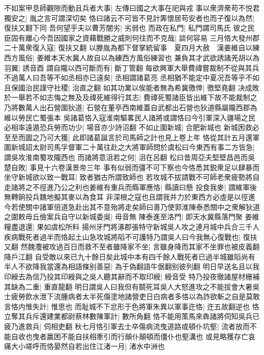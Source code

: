 不如案甲息師觀隙而動且兵者大事|{
	左傳曰國之大事在祀與戎}
事以衆濟衆苟不悦君獨安之|{
	胤之言可謂深切矣}
恪曰諸云不可皆不見計筭懷居苟安者也而子復以為然|{
	復扶又翻下同}
吾何望乎夫以曹芳闇劣|{
	劣弱也}
而政在私門|{
	私門謂司馬氏}
彼之民臣固有離心今吾因國家之資藉戰勝之威則何往而不克哉|{
	談何容易}
三月恪大發州郡二十萬衆復入寇|{
	復扶又翻}
以滕胤為都下督掌統留事　夏四月大赦　漢姜維自以練西方風俗|{
	姜維本天水冀人故自以為練西方風俗練習也}
兼負其才武欲誘諸羌胡以為羽翼|{
	誘音酉}
謂自隴以西可斷而有|{
	斷丁管翻}
每欲興軍大舉費禕嘗裁制不從與其兵不過萬人曰吾等不如丞相亦已遠矣|{
	丞相謂諸葛亮}
丞相猶不能定中夏况吾等乎不如且保國治民謹守社稷|{
	治直之翻}
如其功業以俟能者無為希冀徼倖|{
	徼堅堯翻}
决成敗於一舉若不如志悔之無及及禕死維得行其志|{
	費禕死蜀諸臣皆出維下故不能裁制之}
乃將數萬人出石營圍狄道|{
	石營在董亭西南維蓋自武都出石營也狄道縣屬隴西郡為維以勞民亡蜀張本}
吳諸葛恪入寇淮南驅畧民人諸將或謂恪曰今引軍深入疆場之民必相率遠遁恐兵勞而功少|{
	場音亦少詩沼翻}
不如止圍新城|{
	合肥新城也}
新城困救必至至而圖之乃可大獲|{
	此即諸葛誕言於司馬師之計也見上卷上年}
恪從其計五月還軍圍新城詔太尉司馬孚督軍二十萬往赴之大將軍師問於虞松曰今東西有事二方皆急|{
	謂吳攻淮南蜀攻隴西也}
而諸將意沮若之何|{
	沮在呂翻}
松曰昔周亞夫堅壁昌邑而吳楚自敗|{
	事見十六卷漢景帝三年}
事有似弱而彊不可下察也今恪悉其鋭衆足以肆暴而坐守新城欲以致一戰耳|{
	致者猶古所謂致師也}
若攻城不拔請戰不可師老衆疲勢將自走諸將之不徑進乃公之利也姜維有重兵而縣軍應恪|{
	縣讀曰懸}
投食我麥|{
	謂維軍後無轉餉投兵魏地擬其麥以為食耳}
非深根之寇也且謂我并力於東西方必虛是以徑進今若使關中諸軍倍道急赴出其不意殆將走矣師曰善乃使郭淮陳泰悉關中之衆解狄道之圍敕毋丘儉案兵自守以新城委吳|{
	毋音無}
陳泰進至洛門|{
	即天水冀縣落門聚}
姜維糧盡退還|{
	果如虞松所料}
揚州牙門將涿郡張特守新城吳人攻之連月城中兵合三千人疾病戰死者過半而恪起土山急攻城將䧟不可護特乃謂吳人曰今我無心復戰也|{
	復扶又翻}
然魏灋被攻過百日而救不至者雖降家不坐|{
	言雖身降而其家不坐罪也被皮義翻降戶江翻}
自受敵以來已九十餘日矣此城中本有四千餘人戰死者已過半城雖䧟尚有半人不欲降我當還為相語條别善惡|{
	為于偽翻語牛倨翻别彼列翻}
明日早送名且以我印綬去為信乃投其印綬與之吳人聽其辭而不取印綬|{
	綬音受}
特乃投夜徹諸屋材栅補其缺為二重|{
	重直龍翻}
明日謂吳人曰我但有鬬死耳吳人大怒進攻之不能拔會大暑吳士疲勞飲水泄下流腫病者太半死傷塗地諸營吏日白病者多恪以為詐欲斬之自是莫敢言恪内惟失計|{
	惟思也}
而耻城不下忿形于色將軍朱異以軍事迕恪|{
	迕五故翻逆也}
恪立奪其兵斥還建業都尉蔡林數陳軍計|{
	數所角翻}
恪不能用策馬來犇諸將伺知吳兵已疲乃進救兵|{
	伺相吏翻}
秋七月恪引軍去士卒傷病流曳道路或頓仆坑壑|{
	流者放而不能自收也曳者羸困不能自扶相牽引而行顛仆顛頓而僵仆也壑溝也}
或見略獲存亡哀痛大小嗟呼而恪晏然自若出住江渚一月|{
	渚水中洲也}
